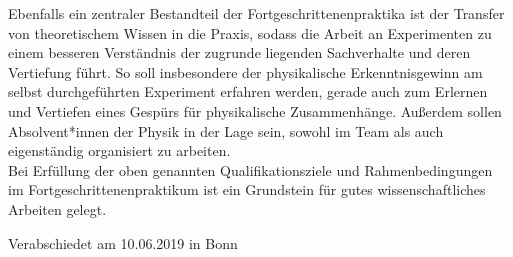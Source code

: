 ﻿\documentclass[DIV=calc]{scrartcl}
\begin{document}
Ebenfalls ein zentraler Bestandteil der Fortgeschrittenenpraktika ist der Transfer von theoretischem Wissen in die Praxis, sodass die Arbeit an Experimenten zu einem besseren Verständnis der zugrunde liegenden Sachverhalte und deren Vertiefung führt. So soll insbesondere der physikalische Erkenntnisgewinn am selbst durchgeführten Experiment erfahren werden, gerade auch zum Erlernen und Vertiefen eines Gespürs für physikalische Zusammenhänge. Außerdem sollen Absolvent*innen der Physik in der Lage sein, sowohl im Team als auch eigenständig organisiert zu arbeiten.\\[-0.25cm]

Bei Erfüllung der oben genannten Qualifikationsziele und Rahmenbedingungen im Fortgeschrittenenpraktikum ist ein Grundstein für gutes wissenschaftliches Arbeiten gelegt.\\[-0.7cm]
    \begin{flushright}
        Verabschiedet am 10.06.2019 in Bonn
    \end{flushright}
\end{document}
